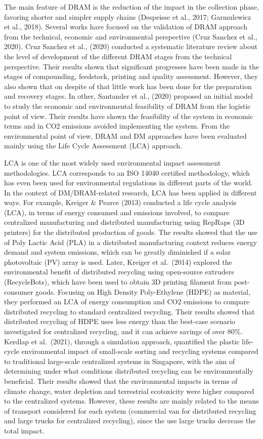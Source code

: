 \documentclass[]{elsarticle} %
\begin{document}
The main feature of DRAM is the reduction of the impact in the collection phase, favoring shorter and simpler supply chains (Despeisse et al., 2017; Garmulewicz et al., 2018).
Several works have focused on the validation of DRAM approach from the technical, economic and environmental perspective (Cruz Sanchez et al., 2020).
Cruz Sanchez et al., (2020) conducted a systematic literature review about the level of development of the different DRAM stages from the technical perspective.
Their results shown that significant progresses have been made in the stages of compounding, feedstock, printing and quality assessment.
However, they also shown that on despite of that little work has been done for the preparation and recovery stages.
In other, Santander et al., (2020) proposed an initial model to study the economic and environmental feasibility of DRAM from the logistic point of view. Their results have shown the feasibility of the system in economic terms and in CO2 emissions avoided implementing the system.
From the environmental point of view, DRAM and DM approaches have been evaluated mainly using the Life Cycle Assessment (LCA) approach.

LCA is one of the most widely used environmental impact assessment methodologies. LCA corresponds to an ISO 14040 certified methodology, which has even been used for environmental regulations in different parts of the world.
In the context of DM/DRAM-related research, LCA has been applied in different ways. For example, Kreiger \& Pearce (2013) conducted a life cycle analysis (LCA), in terms of energy consumed and emissions involved, to compare centralized manufacturing and distributed manufacturing using RepRaps (3D printers) for the distributed production of goods.
The results showed that the use of Poly Lactic Acid (PLA) in a distributed manufacturing context reduces energy demand and system emissions, which can be greatly diminished if a solar photovoltaic (PV) array is used.
Later, Kreiger et al.~(2014) explored the environmental benefit of distributed recycling using open-source extruders (RecycleBots), which have been used to obtain 3D printing filament from post-consumer goods.
Focusing on High Density Poly-Ethylene (HDPE) as material, they performed an LCA of energy consumption and CO2 emissions to compare distributed recycling to standard centralized recycling.
Their results showed that distributed recycling of HDPE uses less energy than the best-case scenario investigated for centralized recycling, and it can achieve savings of over 80\%.
Kerdlap et al.~(2021), through a simulation approach, quantified the plastic life-cycle environmental impact of small-scale sorting and recycling systems compared to traditional large-scale centralized systems in Singapore, with the aim of determining under what conditions distributed recycling can be environmentally beneficial.
Their results showed that the environmental impacts in terms of climate change, water depletion and terrestrial ecotoxicity were higher compared to the centralized systems.
However, these results are mainly related to the means of transport considered for each system (commercial van for distributed recycling and large trucks for centralized recycling), since the use large trucks decrease the total impact.
\end{document}
